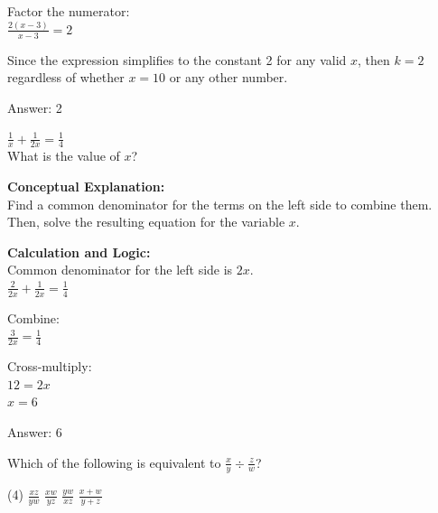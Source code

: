 \documentclass[11pt,paper=a4,answers]{exam}
\begin{document}
\begin{questions}
\begin{solution}
Factor the numerator: \\
$\frac{2(x-3)}{x-3} = 2$

\vspace{10pt}

Since the expression simplifies to the constant 2 for any valid $x$, then $k = 2$ regardless of whether $x = 10$ or any other number.

\vspace{25pt}

Answer: \colorbox{yellow!100}{2}
\end{solution}

\vspace{40pt}

\question
$\frac{1}{x} + \frac{1}{2x} = \frac{1}{4}$ \\
What is the value of $x$?

\begin{solution}
\textbf{Conceptual Explanation:} \\
Find a common denominator for the terms on the left side to combine them. Then, solve the resulting equation for the variable $x$.

\vspace{20pt}

\textbf{Calculation and Logic:} \\
Common denominator for the left side is $2x$. \\
$\frac{2}{2x} + \frac{1}{2x} = \frac{1}{4}$

\vspace{10pt}

Combine: \\
$\frac{3}{2x} = \frac{1}{4}$

\vspace{10pt}

Cross-multiply: \\
$12 = 2x$ \\
$x = 6$

\vspace{25pt}

Answer: \colorbox{yellow!100}{6}
\end{solution}

\vspace{40pt}

\question
Which of the following is equivalent to $\frac{x}{y} \div \frac{z}{w}$?
\begin{tasks}(4)
    \task $\frac{xz}{yw}$
    \task $\frac{xw}{yz}$
    \task $\frac{yw}{xz}$
    \task $\frac{x+w}{y+z}$
\end{tasks}


\end{questions}
\end{document}
